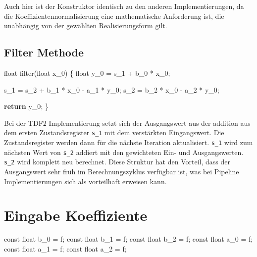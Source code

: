 \documentclass[
  ngerman,
  letterpaper,
  DIV=11]{scrreprt}
\newenvironment{Shaded}{\begin{snugshade}}{\end{snugshade}}
\newcommand{\AttributeTok}[1]{\textcolor[rgb]{0.40,0.45,0.13}{#1}}
\newcommand{\ControlFlowTok}[1]{\textcolor[rgb]{0.00,0.23,0.31}{\textbf{#1}}}
\newcommand{\DataTypeTok}[1]{\textcolor[rgb]{0.68,0.00,0.00}{#1}}
\newcommand{\NormalTok}[1]{\textcolor[rgb]{0.00,0.23,0.31}{#1}}
\newcommand{\OperatorTok}[1]{\textcolor[rgb]{0.37,0.37,0.37}{#1}}
\newcommand{\VariableTok}[1]{\textcolor[rgb]{0.07,0.07,0.07}{#1}}
\begin{document}
Auch hier ist der Konstruktor identisch zu den anderen
Implementierungen, da die Koeffizientennormalisierung eine mathematische
Anforderung ist, die unabhängig von der gewählten Realisierungsform
gilt.

\subsection{Filter Methode}\label{filter-methode-2}

\begin{Shaded}
\begin{Highlighting}[]
\DataTypeTok{float}\NormalTok{ filter}\OperatorTok{(}\DataTypeTok{float}\NormalTok{ x\_0}\OperatorTok{)}
\OperatorTok{\{}
  \DataTypeTok{float}\NormalTok{ y\_0 }\OperatorTok{=} \VariableTok{s\_1} \OperatorTok{+}\NormalTok{ b\_0 }\OperatorTok{*}\NormalTok{ x\_0}\OperatorTok{;}

  \VariableTok{s\_1} \OperatorTok{=} \VariableTok{s\_2} \OperatorTok{+}\NormalTok{ b\_1 }\OperatorTok{*}\NormalTok{ x\_0 }\OperatorTok{{-}}\NormalTok{ a\_1 }\OperatorTok{*}\NormalTok{ y\_0}\OperatorTok{;} 
  \VariableTok{s\_2} \OperatorTok{=}\NormalTok{ b\_2 }\OperatorTok{*}\NormalTok{ x\_0 }\OperatorTok{{-}}\NormalTok{ a\_2 }\OperatorTok{*}\NormalTok{ y\_0}\OperatorTok{;}
    
  \ControlFlowTok{return}\NormalTok{ y\_0}\OperatorTok{;}
\OperatorTok{\}}  
\end{Highlighting}
\end{Shaded}

Bei der TDF2 Implementierung setzt sich der Ausgangswert aus der
addition aus dem ersten Zustandsregister \texttt{s\_1} mit dem
verstärkten Eingangswert. Die Zustandsregister werden dann für die
nächste Iteration aktualisiert. \texttt{s\_1} wird zum nächsten Wert von
\texttt{s\_2} addiert mit den gewichteten Ein- und Ausgangswerten.
\texttt{s\_2} wird komplett neu berechnet. Diese Struktur hat den
Vorteil, dass der Ausgangswert sehr früh im Berechnungszyklus verfügbar
ist, was bei Pipeline Implementierungen sich als vorteilhaft erweisen
kann.

\section{Eingabe Koeffiziente}\label{eingabe-koeffiziente}

\begin{Shaded}
\begin{Highlighting}[]
\AttributeTok{const} \DataTypeTok{float}\NormalTok{ b\_0 }\OperatorTok{=}\NormalTok{ f}\OperatorTok{;}
\AttributeTok{const} \DataTypeTok{float}\NormalTok{ b\_1 }\OperatorTok{=}\NormalTok{ f}\OperatorTok{;}
\AttributeTok{const} \DataTypeTok{float}\NormalTok{ b\_2 }\OperatorTok{=}\NormalTok{ f}\OperatorTok{;}
\AttributeTok{const} \DataTypeTok{float}\NormalTok{ a\_0 }\OperatorTok{=}\NormalTok{ f}\OperatorTok{;}
\AttributeTok{const} \DataTypeTok{float}\NormalTok{ a\_1 }\OperatorTok{=}\NormalTok{ f}\OperatorTok{;}
\AttributeTok{const} \DataTypeTok{float}\NormalTok{ a\_2 }\OperatorTok{=}\NormalTok{ f}\OperatorTok{;}
\end{Highlighting}
\end{Shaded}
\end{document}

